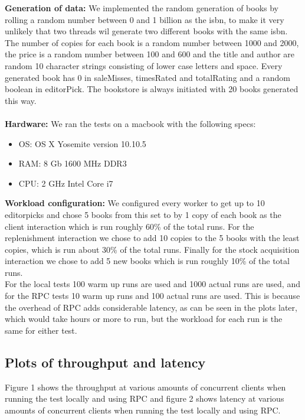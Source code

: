 \documentclass{article}
\theoremstyle{plain}
\theoremstyle{nonumberplain}
\begin{document}
\textbf{Generation of data:}
We implemented the random generation of books by rolling a random number between 0 and 1 billion as the isbn, to make it very unlikely that two threads wil generate two different books with the same isbn. The number of copies for each book is a random number between 1000 and 2000, the price is a random number between 100 and 600 and the title and author are random 10 character strings consisting of lower case letters and space. Every generated book has 0 in saleMisses, timesRated and totalRating and a random boolean in editorPick. The bookstore is always initiated with 20 books generated this way.\\\\
\textbf{Hardware:}
We ran the tests on a macbook with the following specs:
\begin{itemize}
	\item OS: OS X Yosemite version 10.10.5
	\item RAM: 8 Gb 1600 MHz DDR3
	\item CPU: 2 GHz Intel Core i7
\end{itemize}
\textbf{Workload configuration:}
We configured every worker to get up to 10 editorpicks and chose 5 books from this set to by 1 copy of each book as the client interaction which is run roughly 60\% of the total runs. For the replenishment interaction we chose to add 10 copies to the 5 books with the least copies, which is run about 30\% of the total runs. Finally for the stock acquisition interaction we chose to add 5 new books which is run roughly 10\% of the total runs.\\
For the local tests 100 warm up runs are used and 1000 actual runs are used, and for the RPC tests 10 warm up runs and 100 actual runs are used. This is because the overhead of RPC adds considerable latency, as can be seen in the plots later, which would take hours or more to run, but the workload for each run is the same for either test.


\subsection{Plots of throughput and latency}

Figure 1 shows the throughput at various amounts of concurrent clients when running the test locally and using RPC and figure 2 shows latency at various amounts of concurrent clients when running the test locally and using RPC.
\end{document}
